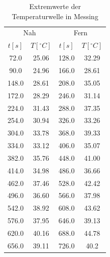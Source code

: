 \documentclass[11pt]{article}
\begin{document}
\begin{table}[P]
\centering
\label{messing_extr}
\begin{tabular}{c|c||c|c}
\multicolumn{2}{c||}{Nah} & \multicolumn{2}{c}{Fern}\\
$t[s]$ & $T[^\circ C]$ & $t[s]$ & $T[^\circ C]$ \\
\hline
72.0 & 25.06 & 128.0 & 32.29\\
90.0 & 24.96 & 166.0 & 28.61\\
148.0 & 28.61 & 208.0 & 35.05\\
172.0 & 28.29 & 246.0 & 31.14\\
224.0 & 31.43 & 288.0 & 37.35\\
254.0 & 30.94 & 326.0 & 33.26\\
304.0 & 33.78 & 368.0 & 39.33\\
334.0 & 33.12 & 406.0 & 35.07\\
382.0 & 35.76 & 448.0 & 41.00\\
414.0 & 34.98 & 486.0 & 36.66\\
462.0 & 37.46 & 528.0 & 42.42\\
496.0 & 36.60 & 566.0 & 37.98\\
542.0 & 38.92 & 608.0 & 43.62\\
576.0 & 37.95 & 646.0 & 39.13\\
620.0 & 40.16 & 688.0 & 44.78\\
656.0 & 39.11 & 726.0 & 40.2\\

\end{tabular}
\caption{Extremwerte der Temperaturwelle in Messing}
\end{table}
\end{document}
